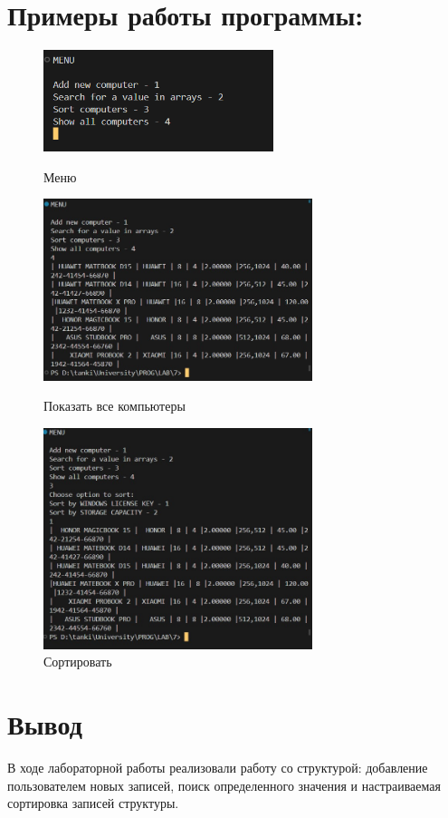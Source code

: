 \documentclass[a4paper,12pt]{report}
\begin{document}
\section*{Примеры работы программы:}
\begin{figure}[ph]
    \includegraphics[width=0.6\textwidth]{ex1.png}
\caption{Меню}
\label{ris:image1}
    \includegraphics[width=0.7\textwidth]{ex2.jpg}
\caption{Показать все компьютеры}
\label{ris:image2}
\includegraphics[width=0.7\textwidth]{ex3.jpg}
\caption{Сортировать}
\label{ris:image3}

\end{figure}


\newpage

\section*{Вывод}
В ходе лабораторной работы реализовали работу со структурой: добавление пользователем новых записей, поиск определенного значения и настраиваемая сортировка записей структуры.
\end{document}
